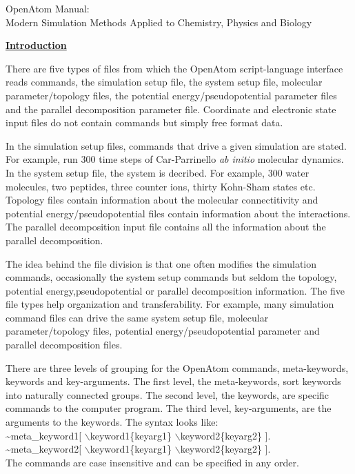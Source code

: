 \documentclass[12pt]{article}
\begin{document}
\large


\vspace*{3.in}
\begin{center}
\huge
OpenAtom Manual: \\
$\ $ \\
\Large
Modern Simulation Methods Applied to Chemistry, Physics and Biology
\end{center}

\clearpage
\huge
\underline{\bf Introduction}
\large

There are five types of files from which the OpenAtom
script-language interface reads commands, the
simulation setup file, the system setup file, molecular parameter/topology
files, the potential energy/pseudopotential parameter files and the
parallel decomposition parameter file. Coordinate and electronic state input files do 
not contain commands but simply free format data. 

In the simulation setup files, commands that drive a given simulation
are stated. For example, run 300 time steps of Car-Parrinello {\em ab initio}
molecular dynamics. In the system setup file, the 
system is decribed. For example, 300 water molecules, two peptides,
three counter ions, thirty Kohn-Sham states etc.  Topology files
contain information about the molecular connectitivity and potential
energy/pseudopotential files contain information about the
interactions. The parallel decomposition
input file contains all the information about the parallel decomposition.

The idea behind the file division is that one often modifies the
simulation commands, occasionally the system setup commands but seldom the 
topology, potential energy,pseudopotential or parallel decomposition
information. 
The five file types help organization and transferability. For
example, many simulation command files can drive the same system setup file, 
molecular parameter/topology files, potential energy/pseudopotential
parameter and parallel decomposition files.

There are three levels of grouping for the OpenAtom commands, 
meta-keywords, keywords and key-arguments.
The first level, the meta-keywords, sort keywords into naturally
connected groups. The second level, the keywords, are specific
commands to the computer program. The third level, key-arguments,
are the arguments to the keywords.  The syntax looks like: \\ 
\hspace*{0.5in} \~{}meta\_keyword1[ $\backslash$keyword1\{keyarg1\}
$\backslash$keyword2\{keyarg2\} ]. \\
\hspace*{0.5in} \~{}meta\_keyword2[ $\backslash$keyword1\{keyarg1\}
$\backslash$keyword2\{keyarg2\} ]. \\
The commands are case insensitive and can be specified in any order.
\end{document}
